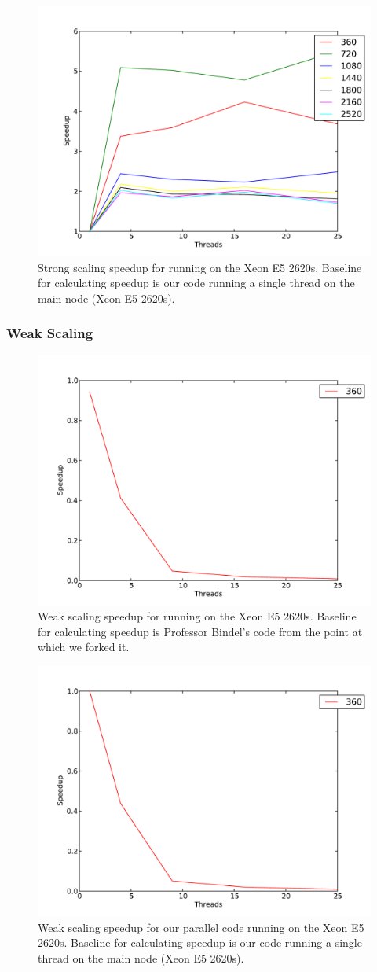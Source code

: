 \documentclass[11pt]{article}
\begin{document}
\begin{figure}[h!]
\includegraphics[width=0.5\linewidth]{e5_strong_e5_baseline.pdf}
\caption{Strong scaling speedup for running on the Xeon E5 2620s. Baseline for calculating speedup is our code running a single thread on the main node (Xeon E5 2620s).}
\end{figure}

\subsubsection{Weak Scaling}
\begin{figure}[h!]
\includegraphics[width=0.5\linewidth]{e5_weak_bindel_baseline.pdf}
\caption{Weak scaling speedup for running on the Xeon E5 2620s. Baseline for calculating speedup is Professor Bindel's code from the point at which we forked it.}
\end{figure}

\begin{figure}[h!]
\includegraphics[width=0.5\linewidth]{e5_weak_e5_baseline.pdf}
\caption{Weak scaling speedup for our parallel code running on the Xeon E5 2620s. Baseline for calculating speedup is our code running a single thread on the main node (Xeon E5 2620s).}
\end{figure}
\end{document}
